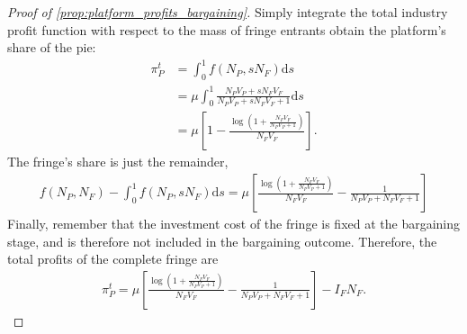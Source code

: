 \documentclass[a4paper]{article}
\newcommand{\ds}{\mathrm{d}s}
\begin{document}
\begin{proof}[Proof of \cref{prop:platform_profits_bargaining}]
    Simply integrate the total industry profit function with respect to the mass of fringe entrants obtain the platform's share of the pie:
    \begin{align*}
        \pi^t_P &= \int_0^1 f(N_P, sN_F) \ds \\
        &= \mu \int_0^1 \frac{N_P V_P + s N_F V_F}{N_P V_P + s N_F V_F + 1} \ds \\
        &= \mu \left[ 1 - \frac{\log \left(1 + \frac{N_F V_F}{N_P V_P + 1} \right)}{N_F V_F} \right].
    \end{align*}
    The fringe's share is just the remainder,
    \begin{align*}
        f(N_P, N_F) - \int_0^1 f(N_P, sN_F) \ds = \mu \left[ \frac{\log \left( 1 + \frac{N_F V_F}{N_P V_P + 1} \right)}{N_F V_F} - \frac{1}{N_P V_P + N_F V_F + 1} \right]
    \end{align*}
    Finally, remember that the investment cost of the fringe is fixed at the bargaining stage, and is therefore not included in the bargaining outcome.
    Therefore, the total profits of the complete fringe are
    \begin{align*}
        \pi^t_P = \mu \left[ \frac{\log \left( 1 + \frac{N_F V_F}{N_P V_P + 1} \right)}{N_F V_F} - \frac{1}{N_P V_P + N_F V_F + 1} \right] - I_F N_F.
    \end{align*}
\end{proof}
\end{document}
